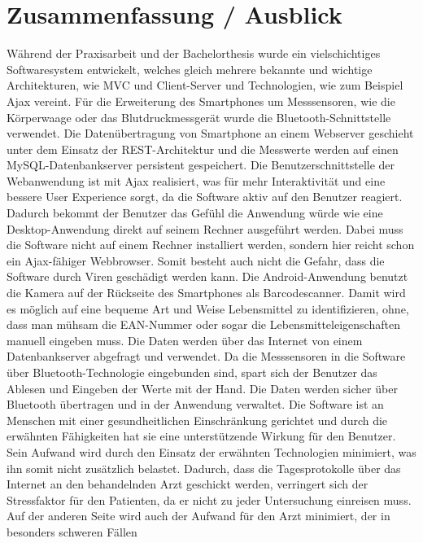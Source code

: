 

\chapter{Zusammenfassung / Ausblick} 


W\"ahrend der Praxisarbeit und der Bachelorthesis wurde ein vielschichtiges Softwaresystem entwickelt,
welches gleich mehrere bekannte und wichtige Architekturen, wie MVC und Client-Server und Technologien, 
wie zum Beispiel Ajax vereint. 
F\"ur die Erweiterung des Smartphones um Messsensoren, wie die K\"orperwaage oder das 
Blutdruckmessger\"at wurde die Bluetooth-Schnittstelle verwendet.
Die Daten\"ubertragung von Smartphone an einem Webserver geschieht unter dem Einsatz der REST-Architektur
und die Messwerte werden auf einen MySQL-Datenbankserver persistent gespeichert.
Die Benutzerschnittstelle der Webanwendung ist mit Ajax realisiert, was f\"ur mehr Interaktivit\"at und 
eine bessere User Experience sorgt, da die Software aktiv auf den Benutzer reagiert.
Dadurch bekommt der Benutzer das Gef\"uhl die Anwendung w\"urde wie eine Desktop-Anwendung direkt auf 
seinem Rechner ausgef\"uhrt werden.
Dabei muss die Software nicht auf einem Rechner installiert werden, sondern hier reicht schon ein 
Ajax-f\"ahiger Webbrowser.
Somit besteht auch nicht die Gefahr, dass die Software durch Viren gesch\"adigt werden kann.
Die Android-Anwendung benutzt die Kamera auf der R\"uckseite des Smartphones als Barcodescanner.
Damit wird es m\"oglich auf eine bequeme Art und Weise Lebensmittel zu identifizieren, ohne, dass man 
m\"uhsam die EAN-Nummer oder sogar die Lebensmitteleigenschaften manuell eingeben muss. 
Die Daten werden \"uber das Internet von einem Datenbankserver abgefragt
und verwendet. 
Da die Messsensoren in die Software \"uber Bluetooth-Technologie eingebunden sind,
spart sich der Benutzer das Ablesen und Eingeben der Werte mit der Hand.
Die Daten werden sicher \"uber Bluetooth \"ubertragen und in der Anwendung verwaltet.
Die Software ist an Menschen mit einer gesundheitlichen Einschr\"ankung gerichtet
und durch die erw\"ahnten F\"ahigkeiten hat sie eine unterst\"utzende Wirkung f\"ur den Benutzer.
Sein Aufwand wird durch den Einsatz der erw\"ahnten Technologien minimiert, was ihn somit nicht 
zus\"atzlich belastet.
Dadurch, dass die Tagesprotokolle \"uber das Internet an den behandelnden Arzt geschickt werden, 
verringert sich der Stressfaktor f\"ur den Patienten, da er nicht zu jeder Untersuchung einreisen muss.
Auf der anderen Seite wird auch der Aufwand f\"ur den Arzt minimiert, der in besonders schweren F\"allen 
